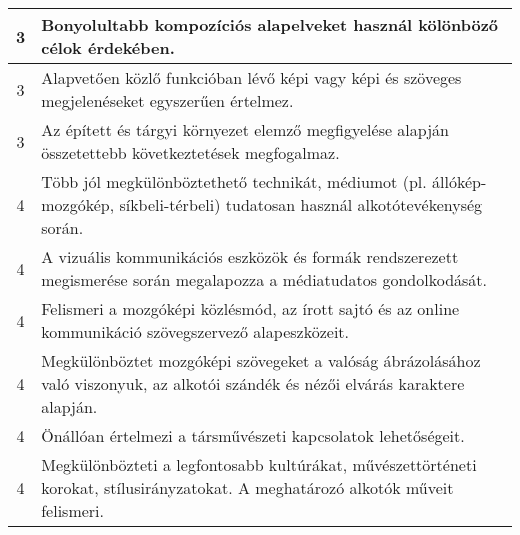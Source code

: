 \begin{longtable}{c | p{12cm} }
                                
                                          3 &  Bonyolultabb kompozíciós alapelveket használ kölönböző célok érdekében. \\ \hline
                                          3 &  Alapvetően közlő funkcióban lévő képi vagy képi és szöveges megjelenéseket egyszerűen értelmez. \\ \hline
                                          3 &  Az épített és tárgyi környezet elemző megfigyelése alapján összetettebb következtetések megfogalmaz. \\ \hline
                                      
                                
                                          4 &  Több jól megkülönböztethető technikát, médiumot (pl. állókép-mozgókép, síkbeli-térbeli) tudatosan használ alkotótevékenység során. \\ \hline
                                          4 &  A vizuális kommunikációs eszközök és formák rendszerezett megismerése során megalapozza a médiatudatos gondolkodását. \\ \hline
                                          4 &  Felismeri a mozgóképi közlésmód, az írott sajtó és az online kommunikáció szövegszervező alapeszközeit. \\ \hline
                                          4 &  Megkülönböztet mozgóképi szövegeket a valóság ábrázolásához való viszonyuk, az alkotói szándék és nézői elvárás karaktere alapján. \\ \hline
                                          4 &  Önállóan értelmezi a társművészeti kapcsolatok lehetőségeit. \\ \hline
                                          4 &  Megkülönbözteti a legfontosabb kultúrákat, művészettörténeti korokat, stílusirányzatokat. A meghatározó alkotók műveit felismeri. \\ \hline
                                      
                        \end{longtable}
            \clearpage

